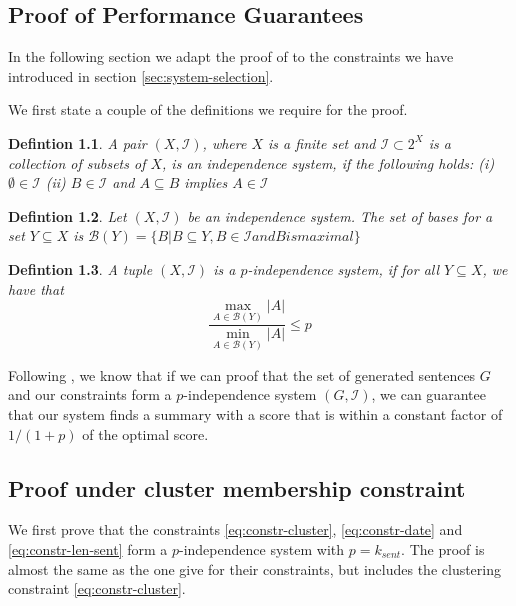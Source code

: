 \documentclass[a4paper,BCOR=10mm]{report}
\numberwithin{lemma}{chapter}
\newtheorem{definition}{Defintion}
\numberwithin{definition}{chapter}
\begin{document}
\begin{appendices}
\chapter{Proof of Performance Guarantees}

In the following section we adapt the proof of \citet{markert} to the constraints we have introduced in section \ref{sec:system-selection}.

We first state a couple of the definitions we require for the proof.

\begin{definition}
A pair $(X, \mathcal{I})$, where $X$ is a finite set and $\mathcal{I} \subset 2^X$ is a collection of subsets of $X$, is an independence system, if the following holds: (i) $\emptyset \in \mathcal{I}$ (ii) $B \in \mathcal{I}$ and $A \subseteq B$ implies $A \in \mathcal{I}$
\end{definition}

\begin{definition}
Let $(X, \mathcal{I})$ be an independence system. The set of bases for a set $Y \subseteq X$ is $\mathcal{B}(Y) = \{B | B \subseteq Y, B \in \mathcal{I} \mathit{ and } B \mathit{ is maximal} \}$
\end{definition}


\begin{definition}
A tuple $(X, \mathcal{I})$ is a $p$-independence system, if for all $Y \subseteq X$, we have that
\begin{equation}
 \frac{\max_{A \in \mathcal{B}(Y)} |A|}{\min_{A \in \mathcal{B}(Y)} |A|} \leq p
\end{equation}
\end{definition}

Following \citet{markert}, we know that if we can proof that the set of generated sentences $G$ and our constraints form a $p$-independence system $(G, \mathcal{I})$, we can guarantee that our system finds a summary with a score that is within a constant factor of $1 / (1 + p)$ of the optimal score.

\section{Proof under cluster membership constraint} \label{sec:proof-cluster-constr}

We first prove that the constraints \ref{eq:constr-cluster}, \ref{eq:constr-date} and \ref{eq:constr-len-sent} form a $p$-independence system with $p = k_{sent}$.
The proof is almost the same as the one \citet{markert} give for their constraints, but includes the clustering constraint \ref{eq:constr-cluster}.


\end{appendices}
\end{document}
